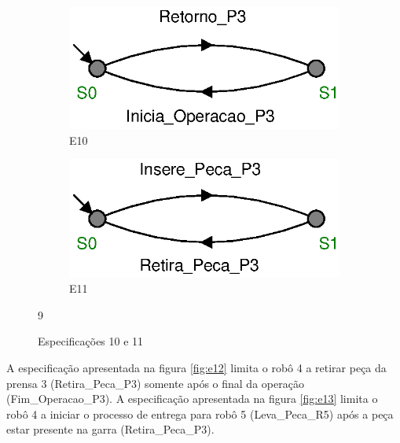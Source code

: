 \begin{figure}[H]%
  \centering
  \begin{subfigure}{0.45\textwidth}
      \centering
      \includegraphics[width=\textwidth]{imagens/E10.eps}
      \caption{E10}
      \label{fig:e10}
  \end{subfigure}
  \hfill
  \begin{subfigure}{0.45\textwidth}
      \centering
      \includegraphics[width=\textwidth]{imagens/E11.eps}
      \caption{E11}
      \label{fig:e11}
  \end{subfigure}9
  \caption{Especificações 10 e 11}
  \label{fig:e1011}
\end{figure}

A especificação apresentada na figura \ref{fig:e12} limita o robô 4 a retirar peça da prensa 3 (Retira\_Peca\_P3) somente após o final da operação (Fim\_Operacao\_P3). A especificação apresentada na figura \ref{fig:e13} limita o robô 4 a iniciar o processo de entrega para robô 5 (Leva\_Peca\_R5) após a peça estar presente na garra (Retira\_Peca\_P3).

